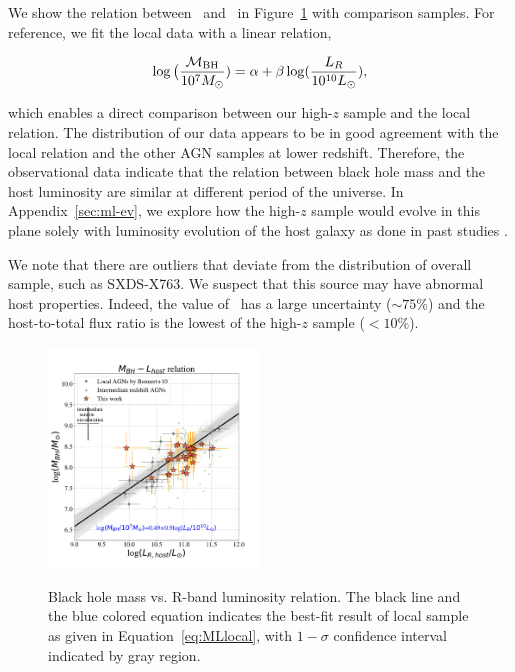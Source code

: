 \documentclass[apj]{emulateapj}
\begin{document}
We show the relation between \mbh\ and \lhost\ in Figure~\ref{fig:ML} with comparison samples. For reference, we fit the local data with a linear relation,

\begin{eqnarray}
\label{eq:MLlocal}
\log \big( \frac{\mathcal M_{\rm BH}}{10^{7}M_{\odot}})= \alpha + \beta \log(\frac{L_R}{10^{10}L_{\odot}}),
\end {eqnarray}

\noindent which enables a direct comparison between our high-$z$ sample and the local relation. The distribution of our data appears to be in good agreement with the local relation and the other AGN samples at lower redshift. Therefore, the observational data indicate that the relation between black hole mass and the host luminosity are similar at different period of the universe. In Appendix~\ref{sec:ml-ev}, we explore how the high-$z$  sample would evolve in this plane solely with luminosity evolution of the host galaxy as done in past studies \citep[e.g., ][]{Ding2017b}. 

We note that there are outliers that deviate from the distribution of overall sample, such as SXDS-X763. We suspect that this source may have abnormal host properties. Indeed, the value of \Reff\ has a large uncertainty ($\sim 75\%$) and the host-to-total flux ratio is the lowest of the high-$z$ sample ($<10\%$). 





\begin{figure}
\centering
{\includegraphics[width=0.5\textwidth]{fig/MBH-L_obs.pdf}}
\caption{\label{fig:ML} 
Black hole mass vs. R-band luminosity relation. The black line and the blue colored equation indicates the best-fit result of local sample as given in Equation~\ref{eq:MLlocal}, with $1-\sigma$ confidence interval indicated by gray region.
}
\end{figure} 
\end{document}
